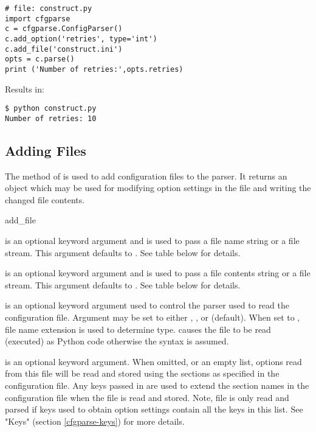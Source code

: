 \documentclass{howto}
\begin{document}
\begin{verbatim}
# file: construct.py
import cfgparse
c = cfgparse.ConfigParser()
c.add_option('retries', type='int')
c.add_file('construct.ini')
opts = c.parse()
print ('Number of retries:',opts.retries)
\end{verbatim}

Results in:
\begin{verbatim}
$ python construct.py
Number of retries: 10
\end{verbatim}

\subsection{Adding Files\label{cfgparse-adding-files}}
    
The  method of  is used to add configuration 
files to the parser.  It returns an object which may be used for modifying
option settings in the file and writing the changed file contents.

  \begin{funcdesc}{add_file}{}

     is an optional keyword argument and is used to pass a file
        name string or a file stream.  This argument defaults to .
        See table below for details.
        
     is an optional keyword argument and is used to pass a file
        contents string or a file stream.  This argument defaults to 
        .  See table below for details.
        
     is an optional keyword argument used to control the parser
        used to read the configuration file.  Argument may be set to either
        , , or  (default).  When set to 
        , file name extension is used to determine type.  
         causes the file to be read (executed) as Python code 
        otherwise the  syntax is assumed.
    
     is an optional keyword argument.  When omitted,  
        or an empty list, options read from this file will be
        read and stored using the sections as specified in the configuration
        file.  Any keys passed in are used to extend the section names in the
        configuration file when the file is read and stored.  Note, file is
        only read and parsed if keys used to obtain option settings contain 
        all the keys in this list.  See "Keys" (section 
        \ref{cfgparse-keys}) for more details.
  \end{funcdesc}
\end{document}
